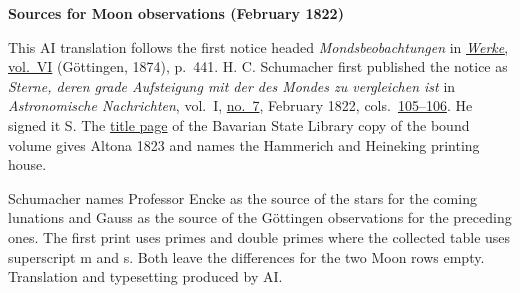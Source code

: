 \clearpage\thispagestyle{empty}
\begin{center}\textbf{Sources for Moon observations (February 1822)}\end{center}
\noindent This AI translation follows the first notice headed \textit{Mondsbeobachtungen} in \href{https://gdz.sub.uni-goettingen.de/id/PPN236007467}{\textit{Werke}, vol.~VI} (Göttingen, 1874), p.~441. H. C. Schumacher first published the notice as \textit{Sterne, deren grade Aufsteigung mit der des Mondes zu vergleichen ist} in \textit{Astronomische Nachrichten}, vol.~I, \href{https://api.digitale-sammlungen.de/iiif/image/v2/bsb10049426_00061/full/1800,/0/default.jpg}{no.~7}, February 1822, cols.~\href{https://api.digitale-sammlungen.de/iiif/image/v2/bsb10049426_00065/full/1800,/0/default.jpg}{105--106}. He signed it S. The \href{https://api.digitale-sammlungen.de/iiif/image/v2/bsb10049426_00005/full/1800,/0/default.jpg}{title page} of the Bavarian State Library copy of the bound volume gives Altona 1823 and names the Hammerich and Heineking printing house.
\par\smallskip\noindent Schumacher names Professor Encke as the source of the stars for the coming lunations and Gauss as the source of the Göttingen observations for the preceding ones. The first print uses primes and double primes where the collected table uses superscript m and s. Both leave the differences for the two Moon rows empty. Translation and typesetting produced by AI.
\clearpage
